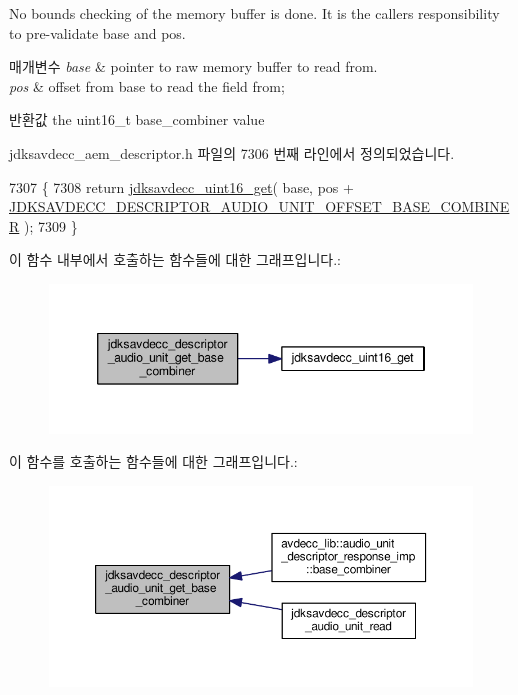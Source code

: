 No bounds checking of the memory buffer is done. It is the caller\textquotesingle{}s responsibility to pre-\/validate base and pos.


\begin{DoxyParams}{매개변수}
{\em base} & pointer to raw memory buffer to read from. \\
\hline
{\em pos} & offset from base to read the field from; \\
\hline
\end{DoxyParams}
\begin{DoxyReturn}{반환값}
the uint16\+\_\+t base\+\_\+combiner value 
\end{DoxyReturn}


jdksavdecc\+\_\+aem\+\_\+descriptor.\+h 파일의 7306 번째 라인에서 정의되었습니다.


\begin{DoxyCode}
7307 \{
7308     \textcolor{keywordflow}{return} \hyperlink{group__endian_ga3fbbbc20be954aa61e039872965b0dc9}{jdksavdecc\_uint16\_get}( base, pos + 
      \hyperlink{group__descriptor__audio_ga4b8ad6660daaf6642215c2912d45de6c}{JDKSAVDECC\_DESCRIPTOR\_AUDIO\_UNIT\_OFFSET\_BASE\_COMBINER} 
      );
7309 \}
\end{DoxyCode}


이 함수 내부에서 호출하는 함수들에 대한 그래프입니다.\+:
\nopagebreak
\begin{figure}[H]
\begin{center}
\leavevmode
\includegraphics[width=346pt]{group__descriptor__audio_ga88f5818dbcc20fcf7f64a84300e62006_cgraph}
\end{center}
\end{figure}




이 함수를 호출하는 함수들에 대한 그래프입니다.\+:
\nopagebreak
\begin{figure}[H]
\begin{center}
\leavevmode
\includegraphics[width=350pt]{group__descriptor__audio_ga88f5818dbcc20fcf7f64a84300e62006_icgraph}
\end{center}
\end{figure}


